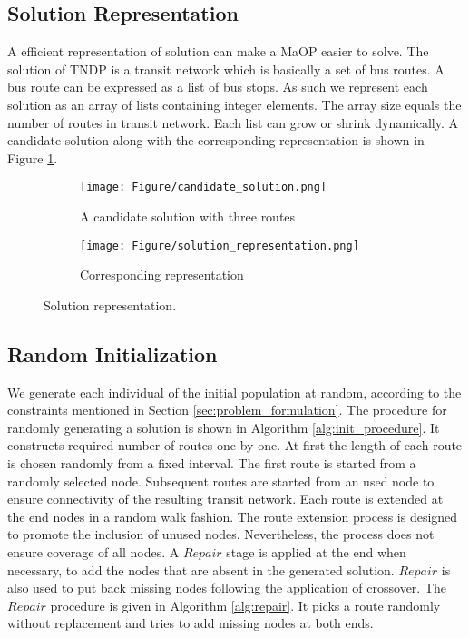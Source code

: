 \subsection{Solution Representation}

A efficient representation of solution can make a MaOP easier to solve. The solution of TNDP is a transit network which is basically a set of bus routes. A bus route can be expressed as a list of bus stops. As such we represent each solution as an array of lists containing integer elements. The array size equals the number of routes in transit network. Each list can grow or shrink dynamically. A candidate solution along with the corresponding representation is shown in Figure \ref{fig:solution_representation}.

\begin{figure}[!htbp]
	\centering
	\begin{subfigure}[b]{0.39\textwidth}
		\texttt{[image: Figure/candidate\_solution.png]}
		\caption{A candidate solution with three routes
			}
	\end{subfigure}
	\hspace*{0.5cm} %
	\begin{subfigure}[b]{0.35\textwidth}
		\texttt{[image: Figure/solution\_representation.png]}
		\caption{Corresponding representation
			}
	\end{subfigure}
	\caption{Solution representation.} \label{fig:solution_representation}
\end{figure}

\subsection{Random Initialization}

We generate each individual of the initial population at random, according to the constraints mentioned in Section \ref{sec:problem_formulation}.  The procedure for randomly generating a solution is shown in Algorithm \ref{alg:init_procedure}. It constructs required number of routes one by one. At first the length of each route is chosen randomly from a fixed interval. The first route is started from a randomly selected node. Subsequent routes are started from an used node to ensure connectivity of the resulting transit network. Each route is extended at the end nodes in a random walk fashion. The route extension process is designed to promote the inclusion of unused nodes. Nevertheless, the process does not ensure coverage of all nodes. A $Repair$ stage is applied at the end when necessary, to add the nodes that are absent in the generated solution. $Repair$ is also used to put back missing nodes following the application of crossover. The $Repair$ procedure is given in Algorithm \ref{alg:repair}. It picks a route randomly without replacement and tries to add missing nodes at both ends.

